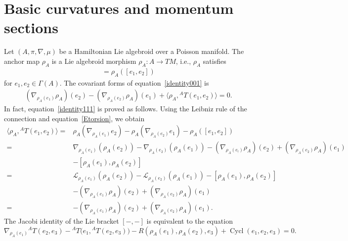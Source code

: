 \documentclass[pdftex]{sigma}
\numberwithin{equation}{section}
\newcommand{\calL}{{\mathcal L}}
\newcommand{\rhoa}{{\rho_A}}
\begin{document}
\section{Basic curvatures and momentum sections}\label{sec3}
Let $(A, \pi, \nabla,\mu)$ be a Hamiltonian Lie algebroid over a Poisson manifold.
The anchor map $\rhoa$ is a Lie algebroid morphism $\rhoa\colon A \rightarrow TM$,
i.e., $\rhoa$ satisfies
\begin{gather}
 [\rhoa(e_1), \rhoa(e_2)] = \rhoa([e_1, e_2])
\label{identity001}
\end{gather}
for $e_1, e_2 \in \Gamma(A)$.
The covariant forms of equation~\eqref{identity001}
is
\begin{gather}
(\nabla_{\rhoa(e_1)} \rhoa)(e_2) - (\nabla_{\rhoa(e_2)} \rhoa)(e_1)
+ \bigl\langle\rhoa,{}^A T(e_1, e_2)\bigr\rangle= 0.
\label{identity111}
\end{gather}
In fact, equation~\eqref{identity111} is proved as follows.
Using the Leibniz rule of the connection and equation~\eqref{Etorsion}, we obtain
\begin{align*}
\bigl\langle\rhoa,{}^A T(e_1, e_2)\bigr\rangle ={}&
\rhoa (\nabla_{\rhoa(e_1)} e_2) - \rhoa (\nabla_{\rhoa(e_2)} e_1)
- \rhoa([e_1, e_2])
 \\
={}&
\nabla_{\rhoa(e_1)} (\rhoa(e_2)) - \nabla_{\rhoa(e_2)} (\rhoa (e_1))
- (\nabla_{\rhoa(e_!)} \rhoa)(e_2) + (\nabla_{\rhoa(e_2)} \rhoa) ( e_1)
 \\ &
- [\rhoa(e_1), \rhoa(e_2)]
 \\
={}&
\calL_{\rhoa(e_1)} (\rhoa(e_2)) - \calL_{\rhoa(e_2)} (\rhoa (e_1))
- [\rhoa(e_1), \rhoa(e_2)]
 \\ &
- (\nabla_{\rhoa(e_1)} \rhoa)(e_2) + (\nabla_{\rhoa(e_2)} \rhoa) ( e_1)
 \\
={}&
- (\nabla_{\rhoa(e_1)} \rhoa)(e_2) + (\nabla_{\rhoa(e_2)} \rhoa) ( e_1).
\end{align*}
The Jacobi identity of the Lie bracket $[-,-]$ is equivalent to the equation
\[%
\nabla_{\rhoa(e_1)} {}^A T(e_2, e_3) - {}^A T\bigl(e_1, {}^A T(e_2, e_3)\bigr)
- R(\rhoa(e_1), \rhoa(e_2), e_3) + \operatorname{Cycl}(e_1, e_2, e_3)
= 0.
\]
\end{document}

